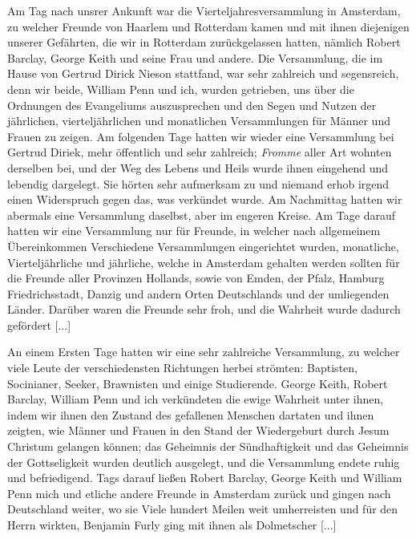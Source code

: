 Am Tag nach unsrer Ankunft war die Vierteljahresversammlung 
in Amsterdam, zu welcher Freunde von Haarlem und Rotterdam
kamen und mit ihnen diejenigen unserer Gefährten, die wir
in Rotterdam zurückgelassen hatten, nämlich Robert Barclay,
George Keith und seine Frau und andere. Die Versammlung, die
im Hause von Gertrud Dirick Nieson 
stattfand, war sehr zahlreich und segensreich, denn wir beide, 
William Penn und ich, wurden
getrieben, uns über die Ordnungen des Evangeliums auszusprechen
und den Segen und Nutzen der jährlichen, vierteljährlichen und 
monatlichen Versammlungen für Männer und Frauen zu zeigen. Am
folgenden Tage hatten wir wieder eine Versammlung bei Gertrud
Diriek, mehr öffentlich und sehr 
zahlreich; \textit{Fromme} aller Art
wohnten derselben bei, und der Weg des Lebens und Heils wurde
ihnen eingehend und lebendig dargelegt. Sie hörten sehr 
aufmerksam zu und niemand erhob irgend einen Widerspruch gegen
das, was verkündet wurde. Am Nachmittag hatten wir abermals
eine Versammlung daselbst, aber im engeren Kreise. Am Tage
darauf hatten wir eine Versammlung nur für 
Freunde, in welcher
nach allgemeinem Übereinkommen Verschiedene Versammlungen 
eingerichtet wurden, monatliche, Vierteljährliche und jährliche, welche
in Amsterdam gehalten werden sollten für die Freunde aller
Provinzen Hollands, sowie von Emden, der 
Pfalz, Hamburg Friedrichsstadt, 
Danzig und andern Orten Deutschlands und der
umliegenden Länder. Darüber waren die Freunde sehr froh, und
die Wahrheit wurde dadurch gefördert [...]

An einem Ersten Tage hatten wir eine sehr zahlreiche Versammlung, 
zu welcher viele Leute der verschiedensten Richtungen
herbei strömten: Baptisten, Socinianer, 
Seeker, Brawnisten und
einige Studierende. George Keith, Robert Barclay, William Penn
und ich verkündeten die ewige Wahrheit unter ihnen, indem wir
ihnen den Zustand des gefallenen Menschen dartaten und ihnen
zeigten, wie Männer und Frauen in den Stand der Wiedergeburt
durch Jesum Christum gelangen können; das Geheimnis der Sündhaftigkeit 
und das Geheimnis der Gottseligkeit wurden deutlich
ausgelegt, und die Versammlung endete ruhig und befriedigend.
Tags darauf ließen Robert Barclay, George Keith und William
Penn mich und etliche andere Freunde in Amsterdam zurück und
gingen nach Deutschland weiter, wo sie Viele hundert Meilen weit
umherreisten und für den Herrn wirkten, Benjamin Furly ging mit
ihnen als Dolmetscher [...]

